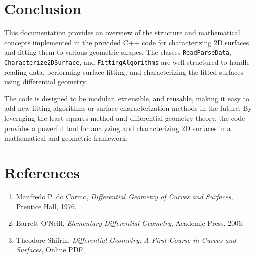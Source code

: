 \documentclass[12pt]{article}
\begin{document}
\section{Conclusion}
This documentation provides an overview of the structure and mathematical concepts implemented in the provided C++ code for characterizing 2D surfaces and fitting them to various geometric shapes. The classes \texttt{ReadParseData}, \texttt{Characterize2DSurface}, and \texttt{FittingAlgorithms} are well-structured to handle reading data, performing surface fitting, and characterizing the fitted surfaces using differential geometry.

The code is designed to be modular, extensible, and reusable, making it easy to add new fitting algorithms or surface characterization methods in the future. By leveraging the least squares method and differential geometry theory, the code provides a powerful tool for analyzing and characterizing 2D surfaces in a mathematical and geometric framework.

\section*{References}

\begin{enumerate}
  \item Manfredo P. do Carmo, \textit{Differential Geometry of Curves and Surfaces}, Prentice Hall, 1976.
  \item Barrett O'Neill, \textit{Elementary Differential Geometry}, Academic Press, 2006.
  \item Theodore Shifrin, \textit{Differential Geometry: A First Course in Curves and Surfaces}, \href{http://math.uga.edu/~shifrin/ShifrinDiffGeo.pdf}{Online PDF}.
\end{enumerate}
\end{document}
